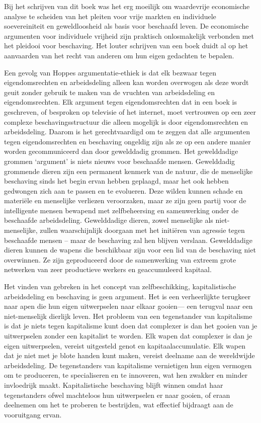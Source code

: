 \documentclass[
  a5paper,
  smalldemyvopaper,11pt,twoside,onecolumn,openright,extrafontsizes,
hidelinks]{memoir}
\begin{document}
Bij het schrijven van dit boek was het erg moeilijk om waardevrije
economische analyse te scheiden van het pleiten voor vrije markten en
individuele soevereiniteit en geweldloosheid als basis voor beschaafd
leven. De economische argumenten voor individuele vrijheid zijn
praktisch onlosmakelijk verbonden met het pleidooi voor beschaving. Het
louter schrijven van een boek duidt al op het aanvaarden van het recht
van anderen om hun eigen gedachten te bepalen.

Een gevolg van Hoppes argumentatie-ethiek is dat elk bezwaar tegen
eigendomsrechten en arbeidsdeling alleen kan worden overwogen als deze
wordt geuit zonder gebruik te maken van de vruchten van arbeidsdeling en
eigendomsrechten. Elk argument tegen eigendomsrechten dat in een boek is
geschreven, of besproken op televisie of het internet, moet vertrouwen
op een zeer complexe beschavingsstructuur die alleen mogelijk is door
eigendomsrechten en arbeidsdeling. Daarom is het gerechtvaardigd om te
zeggen dat alle argumenten tegen eigendomsrechten en beschaving ongeldig
zijn als ze op een andere manier worden gecommuniceerd dan door
gewelddadig grommen. Het gewelddadige grommen `argument' is niets nieuws
voor beschaafde mensen. Gewelddadig grommende dieren zijn een permanent
kenmerk van de natuur, die de menselijke beschaving sinds het begin
ervan hebben geplaagd, maar het ook hebben gedwongen zich aan te passen
en te evolueren. Deze wilden kunnen schade en materiële en menselijke
verliezen veroorzaken, maar ze zijn geen partij voor de intelligente
mensen bewapend met zelfbeheersing en samenwerking onder de beschaafde
arbeidsdeling. Gewelddadige dieren, zowel menselijke als
niet-menselijke, zullen waarschijnlijk doorgaan met het initiëren van
agressie tegen beschaafde mensen -- maar de beschaving zal hen blijven
verslaan. Gewelddadige dieren kunnen de wapens die beschikbaar zijn voor
een lid van de beschaving niet overwinnen. Ze zijn geproduceerd door de
samenwerking van extreem grote netwerken van zeer productieve werkers en
geaccumuleerd kapitaal.

Het vinden van gebreken in het concept van zelfbeschikking,
kapitalistische arbeidsdeling en beschaving is geen argument. Het is een
verheerlijkte terugkeer naar apen die hun eigen uitwerpselen naar elkaar
gooien--- een terugval naar een niet-menselijk dierlijk leven. Het
probleem van een tegenstander van kapitalisme is dat je niets tegen
kapitalisme kunt doen dat complexer is dan het gooien van je
uitwerpselen zonder een kapitalist te worden. Elk wapen dat complexer is
dan je eigen uitwerpselen, vereist uitgesteld genot en
kapitaalaccumulatie. Elk wapen dat je niet met je blote handen kunt
maken, vereist deelname aan de wereldwijde arbeidsdeling. De
tegenstanders van kapitalisme vernietigen hun eigen vermogen om te
produceren, te specialiseren en te innoveren, wat hen zwakker en minder
invloedrijk maakt. Kapitalistische beschaving blijft winnen omdat haar
tegenstanders ofwel machteloos hun uitwerpselen er naar gooien, of eraan
deelnemen om het te proberen te bestrijden, wat effectief bijdraagt aan
de vooruitgang ervan.
\end{document}
